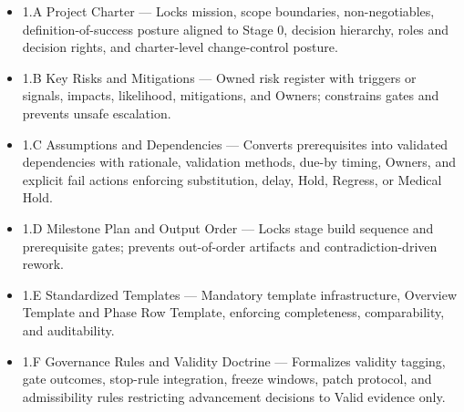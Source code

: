 \documentclass[10pt]{article}
\begin{document}
\begin{itemize}
\item 1.A Project Charter — Locks mission, scope boundaries, non-negotiables, definition-of-success posture aligned to Stage 0, decision hierarchy, roles and decision rights, and charter-level change-control posture.
\item 1.B Key Risks and Mitigations — Owned risk register with triggers or signals, impacts, likelihood, mitigations, and Owners; constrains gates and prevents unsafe escalation.
\item 1.C Assumptions and Dependencies — Converts prerequisites into validated dependencies with rationale, validation methods, due-by timing, Owners, and explicit fail actions enforcing substitution, delay, Hold, Regress, or Medical Hold.
\item 1.D Milestone Plan and Output Order — Locks stage build sequence and prerequisite gates; prevents out-of-order artifacts and contradiction-driven rework.
\item 1.E Standardized Templates — Mandatory template infrastructure, Overview Template and Phase Row Template, enforcing completeness, comparability, and auditability.
\item 1.F Governance Rules and Validity Doctrine — Formalizes validity tagging, gate outcomes, stop-rule integration, freeze windows, patch protocol, and admissibility rules restricting advancement decisions to Valid evidence only.
\end{itemize}
\end{document}
